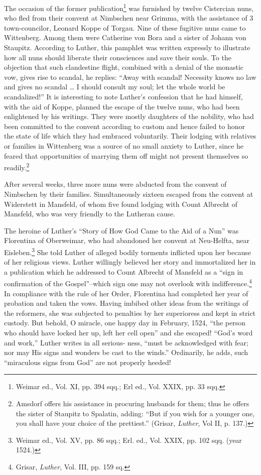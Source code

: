 The occasion of the former publication\footnote
{Weimar ed., Vol. XI, pp. 394 sqq.; Erl ed., Vol. XXIX, pp. 33 sqq.}
was furnished by twelve
Cistercian nuns, who fled from their convent at Nimbschen near
Grimma, with the assistance of 3 town-councilor, Leonard Koppe of
Torgau. Nine of these fugitive nuns came to Wittenberg. Among
them were Catherine von Bora and a sister of Johann von Staupitz.
According to Luther, this pamphlet was written expressly to illustrate
how all nuns should liberate their consciences and save their
souls. To the objection that such clandestine flight, combined with
a denial of the monastic vow, gives rise to scandal, he replies: “Away
with scandal! Necessity knows no law and gives no scandal \dots
I should consult my soul; let the whole world be scandalized!” It
is interesting to note Luther’s confession that he had himself, with
the aid of Koppe, planned the escape of the twelve nuns, who had
been enlightened by his writings. They were mostly daughters of
the nobility, who had been committed to the convent according to
custom and hence failed to honor the state of life which they had
embraced voluntarily. Their lodging with relatives or families in
Wittenberg was a source of no small anxiety to Luther, since he
feared that opportunities of marrying them off might not present
themselves so readily.\footnote
{Amsdorf offers his assistance in procuring husbands for them; thus he offers the sister
of Staupitz to Spalatin, adding: “But if you wish for a younger one, you shall have your
choice of the prettiest.” (Grisar, \textit{Luther}, Vol II, p. 137.)}


After several weeks, three more nuns were abducted from the
convent of Nimbschen by their families. Simultaneously sixteen
escaped from the convent at Widerstett in Mansfeld, of whom five
found lodging with Count Albrecht of Mansfeld, who was very
friendly to the Lutheran cause.

The heroine of Luther’s “Story of How God Came to the Aid of
a Nun” was Florentina of Oberweimar, who had abandoned her
convent at Neu-Helfta, near Eisleben.\footnote{Weimar ed., Vol. XV, pp. 86 sqq.; Erl. ed., Vol. XXIX, pp. 102 sqq. (year 1524.)}
She told Luther of alleged
bodily torments inflicted upon her because of her religious views.
Luther willingly believed her story and immortalized her in a publication
which he addressed to Count Albrecht of Mansfeld as a “sign
in confirmation of the Gospel”--which sign one may not overlook
with indifference.\footnote{Grisar, \textit{Luther}, Vol. III, pp. 159 sq.}
In compliance with the rule of her Order,
Florentina had completed her year of probation and taken the vows.
Having imbibed other ideas from the writings of the reformers,
she was subjected to penalties by her superioress and kept in strict
custody. But behold, O miracle, one happy day in February, 1524,
“the person who should have locked her up, left her cell open” and
she escaped! “God’s word and work,” Luther writes in all serious-
ness, “must be acknowledged with fear; nor may His signs and
wonders be cast to the winds.” Ordinarily, he adds, such “miraculous
signs from God” are not properly heeded!

